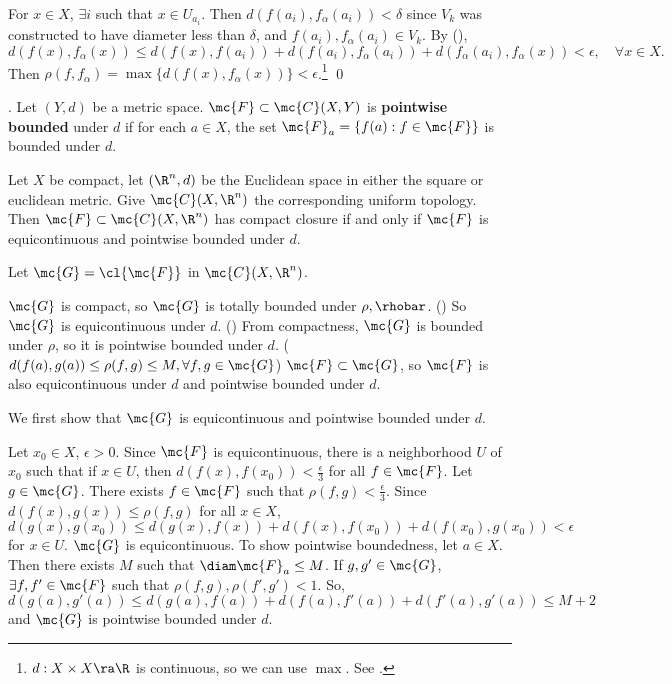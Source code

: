 For \(x \in X\), \(\exists i\) such that \(x \in U_{a_i}\). Then \(d(f(a_i), f_\alpha(a_i)) < \delta\) since \(V_k\) was constructed to have diameter less than \(\delta\), and \(f(a_i), f_\alpha(a_i) \in V_k\). By (\mast),
\[
    d(f(x), f_\alpha(x)) \leq d(f(x), f(a_i)) + d(f(a_i), f_\alpha(a_i)) + d(f_\alpha(a_i), f_\alpha(x)) < \epsilon, \quad \forall x \in X.
\]
Then \(\rho(f, f_\alpha) = \max\{d(f(x), f_\alpha(x))\} < \epsilon\).\footnote{\(d : X \times X \ra \R\) is continuous, so we can use \(\max\). See .} \qed

.  Let \((Y, d)\) be a metric space. \(\mc{F} \subset \mc{C}(X, Y)\) is \textbf{pointwise bounded} under \(d\) if for each \(a \in X\), the set \(\mc{F}_a = \{f(a) : f \in \mc{F}\}\) is bounded under \(d\).

  Let \(X\) be compact, let \((\R^n, d)\) be the Euclidean space in either the square or euclidean metric. Give \(\mc{C}(X, \R^n)\) the corresponding uniform topology. Then \(\mc{F} \subset \mc{C}(X, \R^n)\) has compact closure if and only if \(\mc{F}\) is equicontinuous and pointwise bounded under \(d\).

\pf Let \(\mc{G} = \cl{\mc{F}}\) in \(\mc{C}(X, \R^n)\).

\note{\mimp} \(\mc{G}\) is compact, so \(\mc{G}\) is totally bounded under \(\rho, \rhobar\). () So \(\mc{G}\) is equicontinuous under \(d\). () From compactness, \(\mc{G}\) is bounded under \(\rho\), so it is pointwise bounded under \(d\). (\(d(f(a), g(a)) \leq \rho(f, g) \leq M, \forall f, g \in \mc{G}\)) \(\mc{F} \subset \mc{G}\), so \(\mc{F}\) is also equicontinuous under \(d\) and pointwise bounded under \(d\).

\note{\mimpd} We first show that \(\mc{G}\) is equicontinuous and pointwise bounded under \(d\).

Let \(x_0 \in X\), \(\epsilon > 0\). Since \(\mc{F}\) is equicontinuous, there is a neighborhood \(U\) of \(x_0\) such that if \(x \in U\), then \(d(f(x), f(x_0)) < \frac{\epsilon}{3}\) for all \(f \in \mc{F}\). Let \(g \in \mc{G}\). There exists \(f \in \mc{F}\) such that \(\rho(f, g) < \frac{\epsilon}{3}\). Since \(d(f(x), g(x)) \leq \rho(f, g)\) for all \(x \in X\),
\[
    d(g(x), g(x_0)) \leq d(g(x), f(x)) + d(f(x), f(x_0)) + d(f(x_0), g(x_0)) < \epsilon
\]
for \(x \in U\). \(\mc{G}\) is equicontinuous. To show pointwise boundedness, let \(a \in X\). Then there exists \(M\) such that \(\diam \mc{F}_a \leq M\). If \(g, g' \in \mc{G}\), \(\exists f, f' \in \mc{F}\) such that \(\rho(f, g), \rho(f', g') < 1\). So,
\[
    d(g(a), g'(a)) \leq d(g(a), f(a)) + d(f(a), f'(a)) + d(f'(a), g'(a)) \leq M + 2
\]
and \(\mc{G}\) is pointwise bounded under \(d\).

